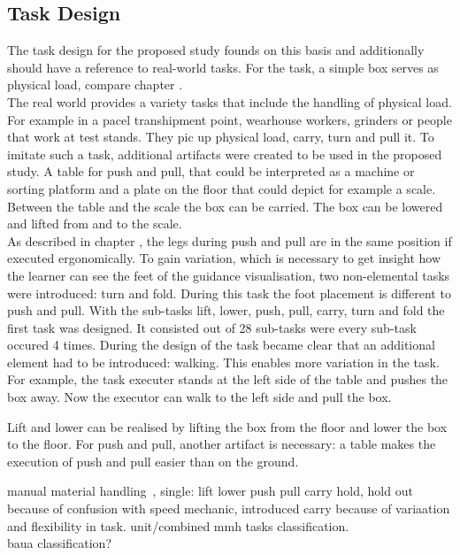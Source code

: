 \subsection{Task Design}
The task design for the proposed study founds on this basis and additionally should have a reference to real-world tasks. For the task, a simple box serves as physical load, compare chapter .\\
The real world provides a variety tasks that include the handling of physical load. For example in a pacel transhipment point, wearhouse workers, grinders or people that work at test stands. They pic up physical load, carry, turn and pull it. To imitate such a task, additional artifacts were created to be used in the proposed study. A table for push and pull, that could be interpreted as a machine or sorting platform and a plate on the floor that could depict for example a scale. Between the table and the scale the box can be carried. The box can be lowered and lifted from and to the scale.\\
As described in chapter , the legs during push and pull are in the same position if executed ergonomically. To gain variation, which is necessary to get insight how the learner can see the feet of the guidance visualisation, two non-elemental tasks were introduced: turn and fold. During this task the foot placement is different to push and pull. With the sub-tasks lift, lower, push, pull, carry, turn and fold the first task was designed. It consisted out of 28 sub-tasks were every sub-task occured 4 times. During the design of the task became clear that an additional element had to be introduced: walking. This enables more variation in the task. For example, the task executer stands at the left side of the table and pushes the box away. Now the executor can walk to the left side and pull the box.


Lift and lower can be realised by lifting the box from the floor and lower the box to the floor. For push and pull, another artifact is necessary: a table makes the execution of push and pull easier than on the ground.


manual material handling~\cite{mmh}, single: lift lower push pull carry hold, hold out because of confusion with speed mechanic, introduced carry because of variaation and flexibility in task. unit/combined mmh tasks classification.\\
baua classification?



